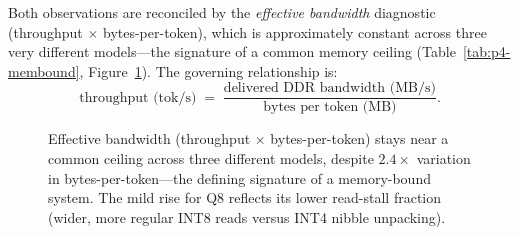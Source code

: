 Both observations are reconciled by the \emph{effective bandwidth} diagnostic
(throughput $\times$ bytes-per-token), which is approximately constant across three very different
models---the signature of a common memory ceiling (Table~\ref{tab:p4-membound},
Figure~\ref{fig:p4-membound}). The governing relationship is:
\[
\text{throughput (tok/s)} \;=\; \frac{\text{delivered DDR bandwidth (MB/s)}}{\text{bytes per token (MB)}}.
\]

\begin{table}[H]
\centering
\caption{Memory-bound evidence. Effective bandwidth (throughput $\times$ bytes/token) is nearly
constant; the separately-measured DDR read bandwidth is shown alongside.}
\label{tab:p4-membound}
\renewcommand{\arraystretch}{1.2}
\end{table}

\begin{figure}[H]
\centering
{}
\caption{Effective bandwidth (throughput $\times$ bytes-per-token) stays near a common ceiling across
three different models, despite $2.4\times$ variation in bytes-per-token---the defining signature of a
memory-bound system. The mild rise for Q8 reflects its lower read-stall fraction (wider, more regular
INT8 reads versus INT4 nibble unpacking).}
\label{fig:p4-membound}
\end{figure}

